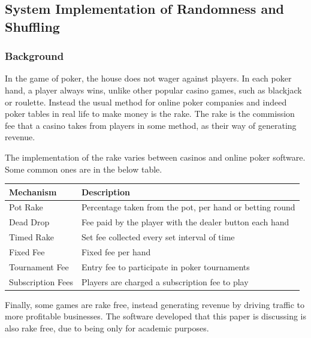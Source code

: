 \subsection{System Implementation of Randomness and Shuffling}

\subsubsection{Background}

In the game of poker, the house does not wager against players. In each
poker hand, a player always wins, unlike other popular casino games, such as 
blackjack or roulette. Instead the usual method for online poker companies and
indeed poker tables in real life to make money is the rake. The rake is the 
commission fee that a casino takes from players in some method, as their way 
of generating revenue.

The implementation of the rake varies between casinos and online poker
software. Some common ones are in the below table.

\begin{center}
    \begin{tabular}{l l}
    \toprule
    Mechanism           & Description                                               \\
    \midrule
    Pot Rake            & Percentage taken from the pot, per hand or betting round  \\ \addlinespace
    Dead Drop           & Fee paid by the player with the dealer button each hand   \\ \addlinespace
    Timed Rake          & Set fee collected every set interval of time              \\ \addlinespace
    Fixed Fee           & Fixed fee per hand                                        \\ \addlinespace
    Tournament Fee      & Entry fee to participate in poker tournaments             \\ \addlinespace
    Subscription Fees   & Players are charged a subscription fee to play            \\
    \bottomrule
    \end{tabular}
\end{center}

Finally, some games are rake free, instead generating revenue by driving
traffic to more profitable businesses. The software developed that this paper
is discussing is also rake free, due to being only for academic purposes.

